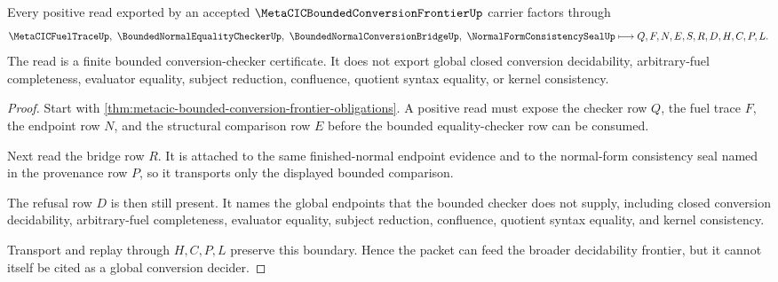 \begin{theorem}
\label{thm:metacic-bounded-conversion-frontier-nonescape}
Every positive read exported by an accepted $\MetaCICBoundedConversionFrontierUp$ carrier factors through
$$
\MetaCICFuelTraceUp,\ \BoundedNormalEqualityCheckerUp,\ \BoundedNormalConversionBridgeUp,\ \NormalFormConsistencySealUp
\longmapsto
Q,F,N,E,S,R,D,H,C,P,L .
$$
The read is a finite bounded conversion-checker certificate. It does not export global closed conversion decidability, arbitrary-fuel completeness, evaluator equality, subject reduction, confluence, quotient syntax equality, or kernel consistency.
\end{theorem}
\begin{proof}
Start with \autoref{thm:metacic-bounded-conversion-frontier-obligations}. A positive read must expose the checker row $Q$, the fuel trace $F$, the endpoint row $N$, and the structural comparison row $E$ before the bounded equality-checker row can be consumed.

Next read the bridge row $R$. It is attached to the same finished-normal endpoint evidence and to the normal-form consistency seal named in the provenance row $P$, so it transports only the displayed bounded comparison.

The refusal row $D$ is then still present. It names the global endpoints that the bounded checker does not supply, including closed conversion decidability, arbitrary-fuel completeness, evaluator equality, subject reduction, confluence, quotient syntax equality, and kernel consistency.

Transport and replay through $H,C,P,L$ preserve this boundary. Hence the packet can feed the broader decidability frontier, but it cannot itself be cited as a global conversion decider.
\end{proof}


